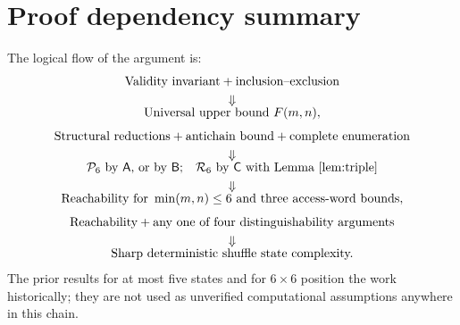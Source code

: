 \documentclass[11pt,letterpaper]{article}
\numberwithin{equation}{section}
\theoremstyle{definition}
\theoremstyle{remark}
\newcommand{\dbA}{\textsf{A}}
\newcommand{\dbB}{\textsf{B}}
\newcommand{\dbC}{\textsf{C}}
\begin{document}
\section{Proof dependency summary}
\label{app:dependency}
The logical flow of the argument is:
\[
\begin{gathered}
\text{Validity invariant}+\text{inclusion--exclusion}\\
\Downarrow\\[-5pt]
\text{Universal upper bound }F(m,n),\\[4pt]
\text{Structural reductions}+\text{antichain bound}
 +\text{complete enumeration}\\
\Downarrow\\[-5pt]
\text{$\mathcal P_6$ by \dbA{}, or by \dbB{};\quad
       $\mathcal R_6$ by \dbC{} with Lemma~\ref{lem:triple}}\\
\Downarrow\\[-5pt]
\text{Reachability for }\min(m,n)\le6
 \text{ and three access-word bounds},\\[4pt]
\text{Reachability}+\text{any one of four distinguishability arguments}\\
\Downarrow\\[-5pt]
\text{Sharp deterministic shuffle state complexity.}
\end{gathered}
\]
The prior results for at most five states and for $6\times6$ position the
work historically; they are not used as unverified computational assumptions
anywhere in this chain.
\end{document}
